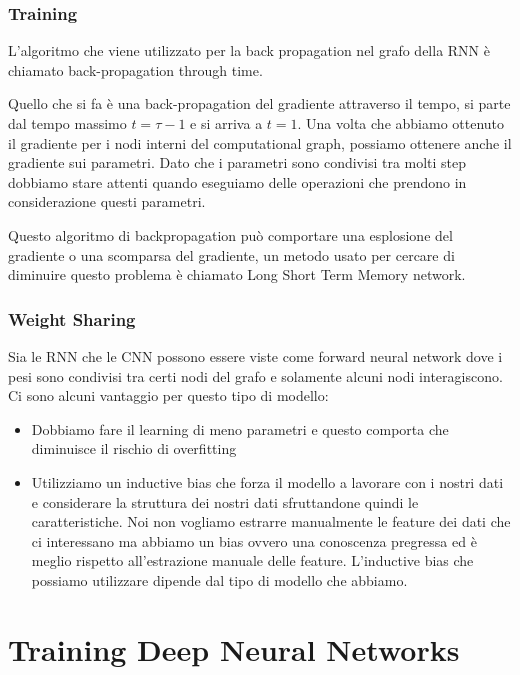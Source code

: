 \documentclass[14pt]{extreport}
\begin{document}
\subsubsection{Training}

L'algoritmo che viene utilizzato per la back propagation nel grafo della RNN è chiamato back-propagation through time.

Quello che si fa è una back-propagation del gradiente attraverso il tempo, si parte dal tempo massimo $t=\tau - 1$ e si arriva a $t=1$.
Una volta che abbiamo ottenuto il gradiente per i nodi interni del computational graph, possiamo ottenere anche il gradiente sui parametri.
Dato che i parametri sono condivisi tra molti step dobbiamo stare attenti quando eseguiamo delle operazioni che prendono in considerazione questi parametri.

Questo algoritmo di backpropagation può comportare una esplosione del gradiente o una scomparsa del gradiente, un metodo usato per cercare di diminuire questo problema
è chiamato Long Short Term Memory network.

\subsubsection{Weight Sharing}

Sia le RNN che le CNN possono essere viste come forward neural network dove i pesi sono condivisi tra certi nodi del grafo e solamente alcuni nodi interagiscono.
Ci sono alcuni vantaggio per questo tipo di modello:
\begin{itemize}
	\item Dobbiamo fare il learning di meno parametri e questo comporta che diminuisce il rischio di overfitting
	\item Utilizziamo un inductive bias che forza il modello a lavorare con i nostri dati e considerare la struttura dei nostri dati sfruttandone quindi le caratteristiche. Noi non vogliamo estrarre manualmente le feature dei dati che ci interessano ma abbiamo un bias ovvero una 
	conoscenza pregressa ed è meglio rispetto all'estrazione manuale delle feature.
	L'inductive bias che possiamo utilizzare dipende dal tipo di modello che abbiamo.
	\end{itemize}


\section{Training Deep Neural Networks}
\end{document}
